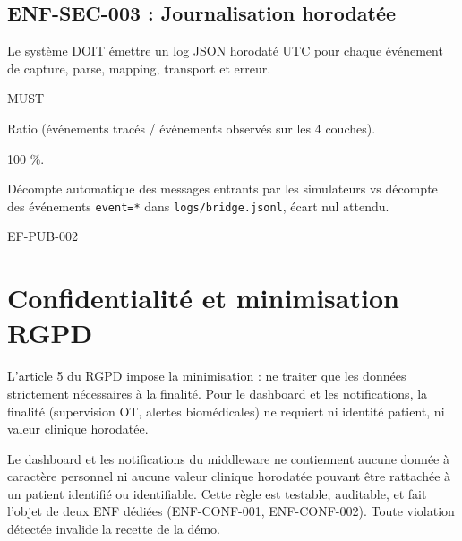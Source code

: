 \subsection*{ENF-SEC-003 : Journalisation horodatée}
\begin{description}[leftmargin=2.5cm, style=nextline]
  \item[Énoncé] Le système DOIT émettre un log JSON horodaté UTC pour chaque événement de capture, parse, mapping, transport et erreur.
  \item[Priorité] MUST
  \item[Métrique] Ratio (événements tracés / événements observés sur les 4 couches).
  \item[Cible] 100 \%.
  \item[Mesure] Décompte automatique des messages entrants par les simulateurs vs décompte des événements \texttt{event=*} dans \texttt{logs/bridge.jsonl}, écart nul attendu.
  \item[Lié à] EF-PUB-002
\end{description}

\section{Confidentialité et minimisation RGPD}
\label{sec:enf-confidentialite}

L'article 5 du RGPD impose la minimisation : ne traiter que les données strictement nécessaires à la finalité. Pour le dashboard et les notifications, la finalité (supervision OT, alertes biomédicales) ne requiert ni identité patient, ni valeur clinique horodatée.

\begin{bridgewarn}
Le dashboard et les notifications du middleware ne contiennent aucune donnée à caractère personnel ni aucune valeur clinique horodatée pouvant être rattachée à un patient identifié ou identifiable. Cette règle est testable, auditable, et fait l'objet de deux ENF dédiées (ENF-CONF-001, ENF-CONF-002). Toute violation détectée invalide la recette de la démo.
\end{bridgewarn}

